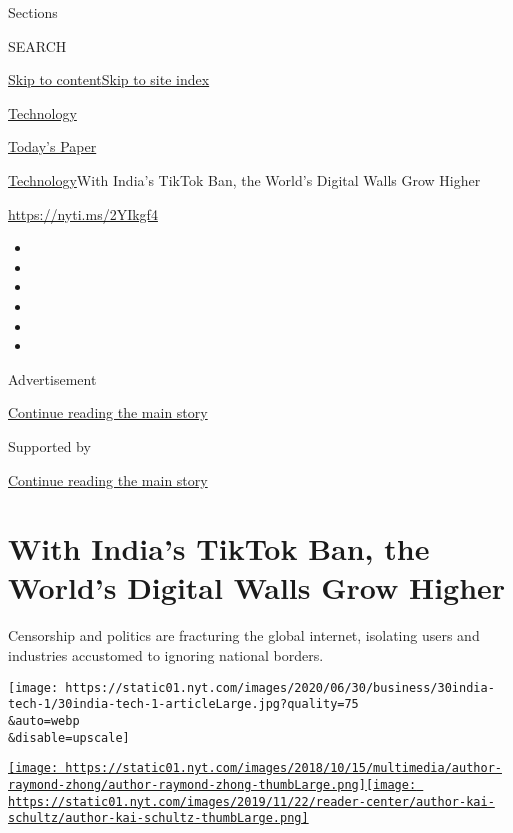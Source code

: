 Sections

SEARCH

\protect\hyperlink{site-content}{Skip to
content}\protect\hyperlink{site-index}{Skip to site index}

\href{https://www.nytimes.com/section/technology}{Technology}

\href{https://myaccount.nytimes.com/auth/login?response_type=cookie\&client_id=vi}{}

\href{https://www.nytimes.com/section/todayspaper}{Today's Paper}

\href{/section/technology}{Technology}\textbar{}With India's TikTok Ban,
the World's Digital Walls Grow Higher

\url{https://nyti.ms/2YIkgf4}

\begin{itemize}
\item
\item
\item
\item
\item
\item
\end{itemize}

Advertisement

\protect\hyperlink{after-top}{Continue reading the main story}

Supported by

\protect\hyperlink{after-sponsor}{Continue reading the main story}

\hypertarget{with-indias-tiktok-ban-the-worlds-digital-walls-grow-higher}{%
\section{With India's TikTok Ban, the World's Digital Walls Grow
Higher}\label{with-indias-tiktok-ban-the-worlds-digital-walls-grow-higher}}

Censorship and politics are fracturing the global internet, isolating
users and industries accustomed to ignoring national borders.

\texttt{[image: https://static01.nyt.com/images/2020/06/30/business/30india-tech-1/30india-tech-1-articleLarge.jpg?quality=75\\\&auto=webp\\\&disable=upscale]}

\href{https://www.nytimes.com/by/raymond-zhong}{\texttt{[image: https://static01.nyt.com/images/2018/10/15/multimedia/author-raymond-zhong/author-raymond-zhong-thumbLarge.png]}}\href{https://www.nytimes.com/by/kai-schultz}{\texttt{[image: https://static01.nyt.com/images/2019/11/22/reader-center/author-kai-schultz/author-kai-schultz-thumbLarge.png]}}

